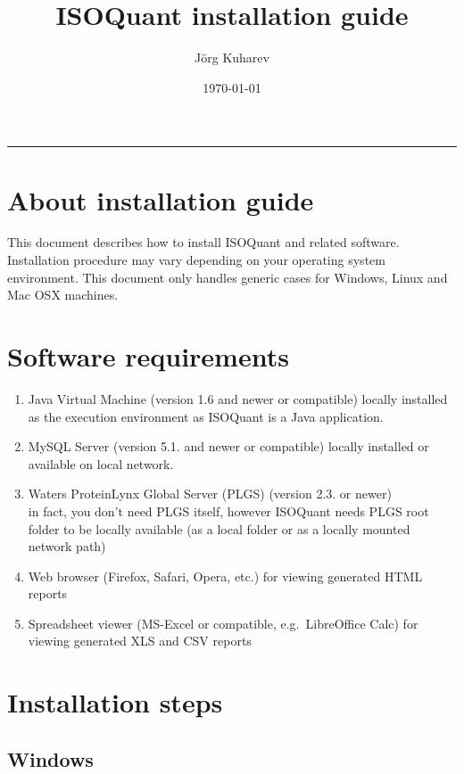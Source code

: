 \documentclass[]{article}
\title{ISOQuant installation guide}
\author{Jörg Kuharev}
\date{\today}
\begin{document}
\maketitle

{
\hypersetup{linkcolor=black}
\tableofcontents
}
\begin{center}\rule{3in}{0.4pt}\end{center}

\clearpage

\section{About installation guide}

This document describes how to install ISOQuant and related software.
Installation procedure may vary depending on your operating system
environment. This document only handles generic cases for Windows, Linux
and Mac OSX machines.

\section{Software requirements}

\begin{enumerate}
\item
  Java Virtual Machine (version 1.6 and newer or compatible) locally
  installed as the execution environment as ISOQuant is a Java
  application.
\item
  MySQL Server (version 5.1. and newer or compatible) locally installed
  or available on local network.
\item
  Waters ProteinLynx Global Server (PLGS) (version 2.3. or newer)\\ in
  fact, you don't need PLGS itself, however ISOQuant needs PLGS root
  folder to be locally available (as a local folder or as a locally
  mounted network path)
\item
  Web browser (Firefox, Safari, Opera, etc.) for viewing generated HTML
  reports
\item
  Spreadsheet viewer (MS-Excel or compatible, e.g.~LibreOffice Calc) for
  viewing generated XLS and CSV reports
\end{enumerate}

\section{Installation steps}

\subsection{Windows}
\end{document}
